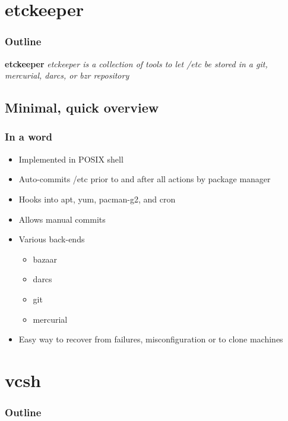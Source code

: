 \documentclass[t]{beamer}
\begin{document}
\section{etckeeper}

\begin{frame}
	\frametitle{Outline}
	\tableofcontents[currentsection]
\end{frame}

\begin{frame}
		\begin{center}
			\vfill
			\vfill
			\textbf{etckeeper}
			\vfill
			\textit{etckeeper is a collection of tools to let /etc be stored in a git, mercurial, darcs, or bzr repository}
			\vfill
			\vfill
		\end{center}
\end{frame}

\subsection{Minimal, quick overview}

\begin{frame}
	\frametitle{In a word}
	\begin{itemize}
		\item Implemented in POSIX shell
		\item Auto-commits /etc prior to and after all actions by package manager
		\item Hooks into apt, yum, pacman-g2, and cron
		\item Allows manual commits
		\item Various back-ends
		\begin{itemize}
			\item bazaar
			\item darcs
			\item git
			\item mercurial
		\end{itemize}
		\item Easy way to recover from failures, misconfiguration or to clone machines
	\end{itemize}
\end{frame}


\section{vcsh}
\begin{frame}
	\frametitle{Outline}
	\tableofcontents[currentsection]
\end{frame}
\end{document}
